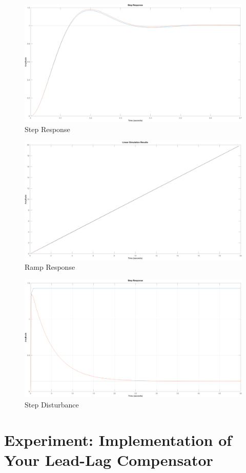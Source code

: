 \documentclass[12pt]{article}
\begin{document}
\begin{figure}[h]
    \centering
    \includegraphics[width=\textwidth]{step_response}
    \caption{\label{fig:step}Step Response}
\end{figure}

\begin{figure}[h]
    \centering
    \includegraphics[width=\textwidth]{ramp_response}
    \caption{\label{fig:ramp}Ramp Response}
\end{figure}

\begin{figure}[h]
    \centering
    \includegraphics[width=\textwidth]{dist_response}
    \caption{\label{fig:dist}Step Disturbance}
\end{figure}

\clearpage

\section{Experiment: Implementation of Your Lead-Lag Compensator}
\end{document}
